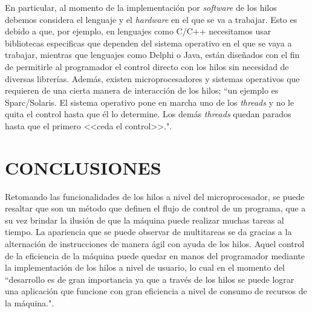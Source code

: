 \documentclass[12pt,letterpaper]{article}
\begin{document}
\newline
\newline
En particular, al momento de la implementación por \textit{software} de los hilos debemos considera el lenguaje y el \textit{hardware} en el que se va a trabajar. Esto es debido a que, por ejemplo, en lenguajes como C/C++ necesitamos usar bibliotecas especificas que dependen del sistema operativo en el que se vaya a trabajar, mientras que lenguajes como Delphi o Java, están diseñados con el fin de permitirle al programador el control directo con los hilos sin necesidad de diversas librerías. Además, existen microprocesadores y sistemas operativos que requieren de una cierta manera de interacción de los hilos; ``un ejemplo es Sparc/Solaris. El sistema operativo pone en marcha uno de los \textit{threads} y no le quita el control hasta que él lo determine. Los demás \textit{threads} quedan parados hasta que el primero <<ceda el control>>."\cite{c7}.
\newline



\section{CONCLUSIONES}
Retomando las funcionalidades de los hilos a nivel del microprocesador, se puede resaltar que son un método que definen el flujo de control de un programa, que a su vez brindar la ilusión de que la máquina puede realizar muchas tareas al tiempo. La apariencia que se puede observar de multitareas se da gracias a la alternación de instrucciones de manera ágil con ayuda de los hilos.
\newline
\newline
Aquel control de la eficiencia de la máquina puede quedar en manos del programador mediante la implementación de los hilos a nivel de usuario, lo cual en el momento del ``desarrollo es de gran importancia ya que a través de los hilos se puede lograr una aplicación que funcione con gran eficiencia a nivel de consumo de recursos de la máquina."\cite{c14}.
\newline


\end{document}
